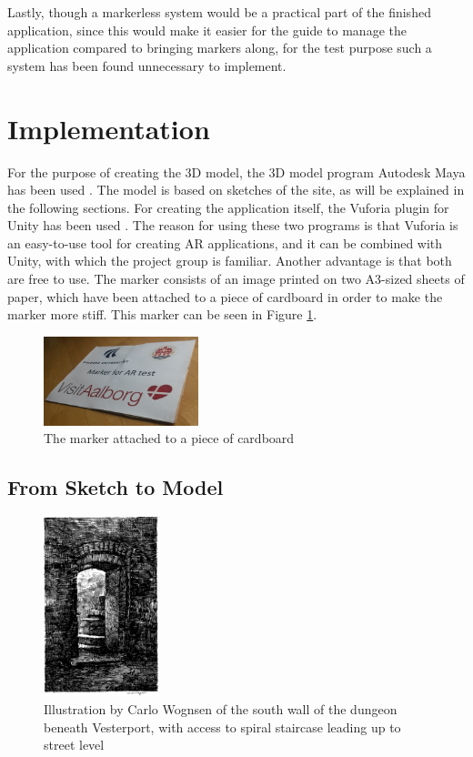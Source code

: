 Lastly, though a markerless system would be a practical part of the finished application, since this would make it easier for the guide to manage the application compared to bringing markers along, for the test purpose such a system has been found unnecessary to implement.

\section{Implementation}
For the purpose of creating the 3D model, the 3D model program Autodesk Maya has been used \cite{Maya}. The model is based on sketches of the site, as will be explained in the following sections. For creating the application itself, the Vuforia plugin for Unity has been used \cite{Vuforia} \cite{Unity}. The reason for using these two programs is that Vuforia is an easy-to-use tool for creating AR applications, and it can be combined with Unity, with which the project group is familiar. Another advantage is that both are free to use. The marker consists of an image printed on two A3-sized sheets of paper, which have been attached to a piece of cardboard in order to make the marker more stiff. This marker can be seen in Figure \ref{fig:marker_photo}.

\begin{figure}[h!]
    \centering
    \includegraphics[width=0.4\textwidth]{figures/marker_photo.jpg}
	\caption{The marker attached to a piece of cardboard}\label{fig:marker_photo}
\end{figure}

\subsection{From Sketch to Model}
\begin{figure}
\centering
        \includegraphics[width=0.3\textwidth]{figures/sketch1.png}
        \caption{Illustration by Carlo Wognsen of the south wall of the dungeon beneath Vesterport,  with access to spiral staircase leading up to street level \cite{Riismoller1961}}\label{fig:sketch1}
\end{figure}

